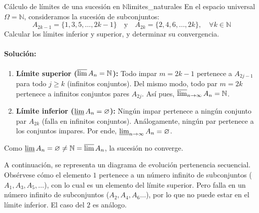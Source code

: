 \begin{ejemplo}{Cálculo de límites de una sucesión en $\mathbb{N}$}{limites_naturales}
En el espacio universal $\Omega = \mathbb{N}$, consideramos la sucesión de subconjuntos:
\[
    A_{2k-1} = \{1, 3, 5, \dots, 2k-1\} \quad \text{y} \quad A_{2k} = \{2, 4, 6, \dots, 2k\}, \quad \forall k \in \mathbb{N}
\]
Calcular los límites inferior y superior, y determinar su convergencia.

\paragraph{Solución:}
\begin{enumerate}
    \item \textbf{Límite superior ($\varlimsup A_n = \mathbb{N}$):} Todo impar $m = 2k-1$ pertenece a $A_{2j-1}$ para todo $j \ge k$ (infinitos conjuntos). Del mismo modo, todo par $m = 2k$ pertenece a infinitos conjuntos pares $A_{2j}$. Así pues, $\varlimsup_{n \to \infty} A_n = \mathbb{N}$.
    \item \textbf{Límite inferior ($\varliminf A_n = \varnothing$):} Ningún impar pertenece a ningún conjunto par $A_{2k}$ (falla en infinitos conjuntos). Análogamente, ningún par pertenece a los conjuntos impares. Por ende, $\varliminf_{n \to \infty} A_n = \varnothing$.
\end{enumerate}
Como $\varliminf A_n = \varnothing \neq \mathbb{N} = \varlimsup A_n$, la sucesión no converge.
\end{ejemplo}

\vspace{1cm}
\noindent
A continuación, se representa un diagrama de evolución pertenencia secuencial. Obsérvese cómo el elemento $1$ pertenece a un número infinito de subconjuntos ($A_1,A_3,A_5,\hdots$), con lo cual es un elemento del límite superior. Pero falla en un número infinito de subconjuntos ($A_2,A_4,A_6\hdots$), por lo que no puede estar en el límite inferior. El caso del $2$ es análogo.

